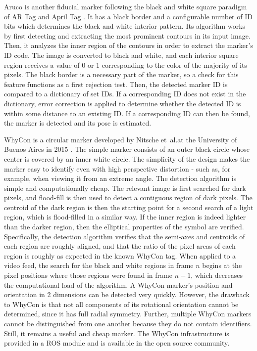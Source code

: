 Aruco is another fiducial marker following the black and white square paradigm of AR Tag and April Tag \cite{aruco_orig}. It has a black border and a configurable number of ID bits which determines the black and white interior pattern. Its algorithm works by first detecting and extracting the most prominent contours in its input image. Then, it analyzes the inner region of the contours in order to extract the marker's ID code. The image is converted to black and white, and each interior square region receives a value of 0 or 1 corresponding to the color of the majority of its pixels. The black border is a necessary part of the marker, so a check for this feature functions as a first rejection test. Then, the detected marker ID is compared to a dictionary of set IDs. If a corresponding ID does not exist in the dictionary, error correction is applied to determine whether the detected ID is within some distance to an existing ID. If a corresponding ID can then be found, the marker is detected and its pose is estimated.

WhyCon is a circular marker developed by Nitsche et~al.\@ at the University of Buenos Aires in 2015 \cite{whycon_paper}. The simple marker consists of an outer black circle whose center is covered by an inner white circle. The simplicity of the design makes the marker easy to identify even with high perspective distortion - such as, for example, when viewing it from an extreme angle. The detection algorithm is simple and computationally cheap. The relevant image is first searched for dark pixels, and flood-fill is then used to detect a contiguous region of dark pixels. The centroid of the dark region is then the starting point for a second search of a light region, which is flood-filled in a similar way. If the inner region is indeed lighter than the darker region, then the elliptical properties of the symbol are verified. Specifically, the detection algorithm verifies that the semi-axes and centroids of each region are roughly aligned, and that the ratio of the pixel areas of each region is roughly as expected in the known WhyCon tag. When applied to a video feed, the search for the black and white regions in frame $n$ begins at the pixel positions where those regions were found in frame $n-1$, which decreases the computational load of the algorithm. A WhyCon marker's position and orientation in 2 dimensions can be detected very quickly. However, the drawback to WhyCon is that not all components of its rotational orientation cannot be determined, since it has full radial symmetry. Further, multiple WhyCon markers cannot be distinguished from one another because they do not contain identifiers. Still, it remains a useful and cheap marker. The WhyCon infrastructure is provided in a ROS module and is available in the open source community.


